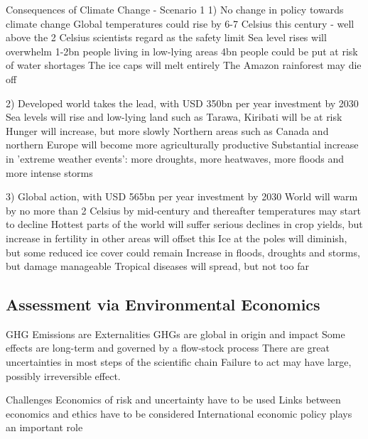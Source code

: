 Consequences of Climate Change - Scenario 1
1) No change in policy towards climate change
	Global temperatures could rise by 6-7 Celsius this century - well above the 2 Celsius scientists regard as the safety limit
	Sea level rises will overwhelm 1-2bn people living in low-lying areas
	4bn people could be put at risk of water shortages
	The ice caps will melt entirely
	The Amazon rainforest may die off

2) Developed world takes the lead, with USD 350bn per year investment by 2030
	Sea levels will rise and low-lying land such as Tarawa, Kiribati will be at risk
	Hunger will increase, but more slowly
	Northern areas such as Canada and northern Europe will become more agriculturally productive
	Substantial increase in 'extreme weather events': more droughts, more heatwaves, more floods and more intense storms

3) Global action, with USD 565bn per year investment by 2030
	World will warm by no more than 2 Celsius by mid-century and thereafter temperatures may start to decline
	Hottest parts of the world will suffer serious declines in crop yields, but increase in fertility in other areas will offset this
	Ice at the poles will diminish, but some reduced ice cover could remain
	Increase in floods, droughts and storms, but damage manageable
	Tropical diseases will spread, but not too far

\subsection{Assessment via Environmental Economics}


GHG Emissions are Externalities
	GHGs are global in origin and impact
	Some effects are long-term and governed by a flow-stock process
	There are great uncertainties in most steps of the scientific chain
	Failure to act may have large, possibly irreversible effect.


Challenges
	Economics of risk and uncertainty have to be used
	Links between economics and ethics have to be considered
	International economic policy plays an important role



